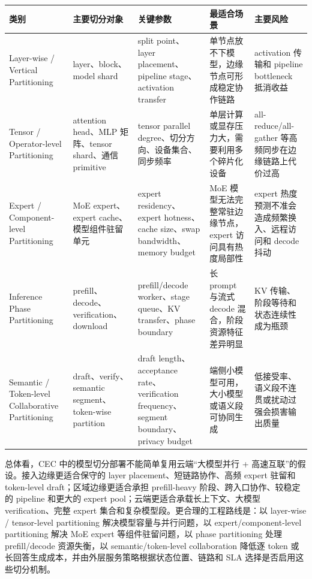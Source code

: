 \documentclass[a4paper,10pt]{ctexart}
\begin{document}
\begin{table}[H]
\centering
\scriptsize
\setlength{\tabcolsep}{3pt}
\renewcommand{\arraystretch}{1.15}
\begin{tabularx}{\textwidth}{|X|X|X|X|X|}
\hline
\textbf{类别} & \textbf{主要切分对象} & \textbf{关键参数} & \textbf{最适合场景} & \textbf{主要风险} \\ \hline
Layer-wise / Vertical Partitioning & layer、block、model shard & split point、layer placement、pipeline stage、activation transfer & 单节点放不下模型，边缘节点可形成稳定协作链路 & activation 传输和 pipeline bottleneck 抵消收益 \\ \hline
Tensor / Operator-level Partitioning & attention head、MLP 矩阵、tensor shard、通信 primitive & tensor parallel degree、切分方向、设备集合、同步频率 & 单层计算或显存压力大，需要利用多个碎片化设备 & all-reduce/all-gather 等高频同步在边缘链路上代价过高 \\ \hline
Expert / Component-level Partitioning & MoE expert、expert cache、模型组件驻留单元 & expert residency、expert hotness、cache size、swap bandwidth、memory budget & MoE 模型无法完整常驻边缘节点，expert 访问具有热度局部性 & expert 热度预测不准会造成频繁换入、远程访问和 decode 抖动 \\ \hline
Inference Phase Partitioning & prefill、decode、verification、download & prefill/decode worker、stage queue、KV transfer、phase boundary & 长 prompt 与流式 decode 混合，阶段资源特征差异明显 & KV 传输、阶段等待和状态连续性成为瓶颈 \\ \hline
Semantic / Token-level Collaborative Partitioning & draft、verify、semantic segment、token-wise partition & draft length、acceptance rate、verification frequency、segment boundary、privacy budget & 端侧小模型可用，大小模型或语义段可协同生成 & 低接受率、语义段不连贯或扰动过强会损害输出质量 \\ \hline
\end{tabularx}
\end{table}




总体看，CEC 中的模型切分部署不能简单复用云端“大模型并行 + 高速互联”的假设。接入边缘更适合保守的 layer placement、短链路协作、高频 expert 驻留和 token-level draft；区域边缘更适合承担 prefill-heavy 阶段、跨入口协作、较稳定的 pipeline 和更大的 expert pool；云端更适合承载长上下文、大模型 verification、完整 expert 集合和复杂模型段。更合理的工程路线是：以 layer-wise / tensor-level partitioning 解决模型容量与并行问题，以 expert/component-level partitioning 解决 MoE expert 等组件驻留问题，以 phase partitioning 处理 prefill/decode 资源失衡，以 semantic/token-level collaboration 降低逐 token 或长回答生成成本，并由外层服务策略根据状态位置、链路和 SLA 选择是否启用这些切分机制。
\end{document}

